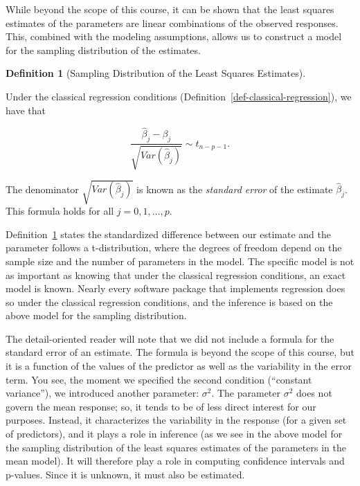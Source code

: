 \documentclass[
  letterpaper,
  DIV=11,
  numbers=noendperiod]{scrreprt}
\theoremstyle{definition}
\newtheorem{definition}{Definition}[chapter]
\theoremstyle{definition}
\theoremstyle{remark}
\begin{document}
\begin{tcolorbox}[enhanced jigsaw, left=2mm, toprule=.15mm, arc=.35mm, breakable, opacitybacktitle=0.6, opacityback=0, rightrule=.15mm, colbacktitle=quarto-callout-note-color!10!white, coltitle=black, leftrule=.75mm, toptitle=1mm, colframe=quarto-callout-note-color-frame, titlerule=0mm, title=\textcolor{quarto-callout-note-color}{\faInfo}\hspace{0.5em}{Note}, bottomrule=.15mm, colback=white, bottomtitle=1mm]

While beyond the scope of this course, it can be shown that the least
squares estimates of the parameters are linear combinations of the
observed responses. This, combined with the modeling assumptions, allows
us to construct a model for the sampling distribution of the estimates.

\end{tcolorbox}

\begin{definition}[Sampling Distribution of the Least Squares
Estimates]\protect\hypertarget{def-ls-sampling-distribution}{}\label{def-ls-sampling-distribution}

Under the classical regression conditions
(Definition~\ref{def-classical-regression}), we have that

\[\frac{\widehat{\beta}_j - \beta_j}{\sqrt{Var\left(\widehat{\beta}_j\right)}} \sim t_{n - p - 1}.\]

The denominator \(\sqrt{Var\left(\widehat{\beta}_j\right)}\) is known as
the \emph{standard error} of the estimate \(\widehat{\beta}_j\). This
formula holds for all \(j = 0, 1, \dotsc, p\).

\end{definition}

Definition~\ref{def-ls-sampling-distribution} states the standardized
difference between our estimate and the parameter follows a
t-distribution, where the degrees of freedom depend on the sample size
and the number of parameters in the model. The specific model is not as
important as knowing that under the classical regression conditions, an
exact model is known. Nearly every software package that implements
regression does so under the classical regression conditions, and the
inference is based on the above model for the sampling distribution.

The detail-oriented reader will note that we did not include a formula
for the standard error of an estimate. The formula is beyond the scope
of this course, but it is a function of the values of the predictor as
well as the variability in the error term. You see, the moment we
specified the second condition (``constant variance''), we introduced
another parameter: \(\sigma^2\). The parameter \(\sigma^2\) does not
govern the mean response; so, it tends to be of less direct interest for
our purposes. Instead, it characterizes the variability in the response
(for a given set of predictors), and it plays a role in inference (as we
see in the above model for the sampling distribution of the least
squares estimates of the parameters in the mean model). It will
therefore play a role in computing confidence intervals and p-values.
Since it is unknown, it must also be estimated.
\end{document}
